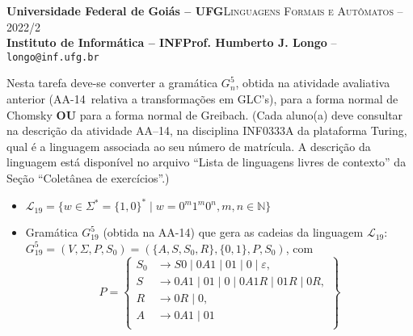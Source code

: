 \documentclass[12pt]{article}
\def\discente{João Lucas Rodrigues Soares}
\def\matricula{202003580}
\def\ua{15}
\def\up{14}
\def\myling{{19}} %
\newcommand{\ve}{\ensuremath{\varepsilon}}
\begin{document}
 \begin{tcolorbox}[rounded corners, colback=blue!3, colframe=blue!40!black]
  \footnotesize\textbf{Universidade Federal de Goiás -- UFG}\hfill \textsc{Linguagens Formais e Autômatos -- 2022/2}\\
  \footnotesize\textbf{Instituto de Informática -- INF\hfill Prof. Humberto J. Longo} -- \scriptsize\texttt{longo@inf.ufg.br}
 \end{tcolorbox}\bigskip
%
\begin{tcolorbox}[rounded corners, colback=blue!2, colframe=blue!40!black, title=\textbf{Atividade AA-\ua}]
 Nesta tarefa deve-se converter a gramática $G_n^5$, obtida na atividade avaliativa anterior (AA-\up\ relativa a transformações em GLC's), para a forma normal de Chomsky \textbf{OU} para a forma normal de Greibach. (Cada aluno(a) deve consultar na descrição da atividade AA--\up, na disciplina INF0333A da plataforma Turing, qual é a linguagem associada ao seu número de matrícula. A descrição da linguagem está disponível no arquivo ``Lista de linguagens livres de contexto'' da Seção ``Coletânea de exercícios''.)
\end{tcolorbox}\bigskip

%
\begin{tcolorbox}[rounded corners, colback=yellow!5, colframe=red!40!black, title={\discente\ (\matricula)}]
\begin{itemize}
  \item  $\mathcal{L}_{\myling} = \{w \in \Sigma^* = \{1,0\}^* \mid w = 0^m1^m0^n,  m, n \in \mathbb{N}\}$
  \item Gramática $G_{\myling}^5$ (obtida na AA-\up) que gera as cadeias da linguagem $\mathcal{L}_{\myling}$:\\
  $G_{\myling}^5=(V,\Sigma,P,S_0)=(\{A,S,S_0,R\},\{0,1\},P,S_0)$, com
    \[P=\left\{
     \begin{aligned}
      S_0 & \to S0\mid 0A1 \mid 01 \mid 0 \mid \ve,\\
      S & \to 0A1 \mid 01 \mid 0 \mid 0A1R \mid 01R \mid 0R, \\
      R & \to 0R \mid 0, \\
      A & \to 0A1 \mid 01 \\
     \end{aligned}
    \right\}\]
 \end{itemize}
\end{tcolorbox}\bigskip
\end{document}
